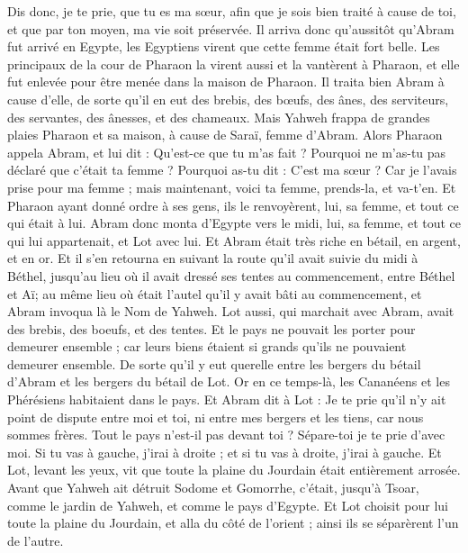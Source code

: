 \begin{multicols}{2}
Dis donc, je te prie, que tu es ma sœur, afin que je sois bien traité à cause de toi, et que par ton moyen, ma vie soit préservée.
Il arriva donc qu'aussitôt qu'Abram fut arrivé en Egypte, les Egyptiens virent que cette femme était fort belle.
Les principaux de la cour de Pharaon la virent aussi et la vantèrent à Pharaon, et elle fut enlevée pour être menée dans la maison de Pharaon.
Il traita bien Abram à cause d'elle, de sorte qu'il en eut des brebis, des bœufs, des ânes, des serviteurs, des servantes, des ânesses, et des chameaux.
Mais Yahweh frappa de grandes plaies Pharaon et sa maison, à cause de Saraï, femme d'Abram.
Alors Pharaon appela Abram, et lui dit : Qu'est-ce que tu m'as fait ? Pourquoi ne m'as-tu pas déclaré que c'était ta femme ?
Pourquoi as-tu dit : C'est ma sœur ? Car je l'avais prise pour ma femme ; mais maintenant, voici ta femme, prends-la, et va-t'en.
Et Pharaon ayant donné ordre à ses gens, ils le renvoyèrent, lui, sa femme, et tout ce qui était à lui.
\VerseOne{}Abram donc monta d'Egypte vers le midi, lui, sa femme, et tout ce qui lui appartenait, et Lot avec lui.
Et Abram était très riche en bétail, en argent, et en or.
Et il s'en retourna en suivant la route qu'il avait suivie du midi à Béthel, jusqu'au lieu où il avait dressé ses tentes au commencement, entre Béthel et Aï;
au même lieu où était l'autel qu'il y avait bâti au commencement, et Abram invoqua là le Nom de Yahweh.
Lot aussi, qui marchait avec Abram, avait des brebis, des boeufs, et des tentes.
Et le pays ne pouvait les porter pour demeurer ensemble ; car leurs biens étaient si grands qu'ils ne pouvaient demeurer ensemble.
De sorte qu'il y eut querelle entre les bergers du bétail d'Abram et les bergers du bétail de Lot. Or en ce temps-là, les Cananéens et les Phérésiens habitaient dans le pays.
Et Abram dit à Lot : Je te prie qu'il n'y ait point de dispute entre moi et toi, ni entre mes bergers et les tiens, car nous sommes frères.
Tout le pays n'est-il pas devant toi ? Sépare-toi je te prie d'avec moi. Si tu vas à gauche, j'irai à droite ; et si tu vas à droite, j'irai à gauche.
Et Lot, levant les yeux, vit que toute la plaine du Jourdain était entièrement arrosée. Avant que Yahweh ait détruit Sodome et Gomorrhe, c'était, jusqu'à Tsoar, comme le jardin de Yahweh, et comme le pays d'Egypte.
Et Lot choisit pour lui toute la plaine du Jourdain, et alla du côté de l'orient ; ainsi ils se séparèrent l'un de l'autre.

\end{multicols}
